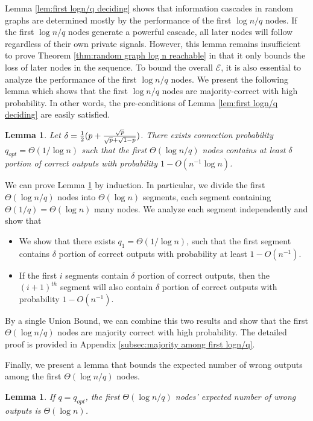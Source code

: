 \documentclass[a4paper,UKenglish]{lipics}
\newtheorem{lem}[thm]{Lemma}
\theoremstyle{definition}
\begin{document}
Lemma \ref{lem:first logn/q deciding} shows that information cascades 
	in random graphs are determined mostly by the performance of the first $\log n/q$ nodes.
If the first $\log n/q$ nodes generate a powerful cascade, all later nodes will follow regardless of their own private signals.
However, this lemma remains insufficient to prove Theorem \ref{thm:random graph log n reachable}
	in that it only bounds the loss of later nodes in the sequence.
To bound the overall $\mathcal{E}$, it is also essential to analyze the performance of the first $\log n/q$ nodes.
We present the following lemma which shows that the first $\log n/q$ nodes are majority-correct with high probability.
In other words, the pre-conditions of Lemma \ref{lem:first logn/q deciding} are easily satisfied.

\begin{lem}
\label{lem:majority among first logn/q}
Let $\delta = {1\over 2}(p + {\sqrt{p}\over \sqrt{p} + \sqrt{1-p}})$.
There exists connection probability $q_{opt} = \Theta(1/\log n)$ such that the first $\Theta(\log n/q)$ nodes 
	contains at least $\delta$ portion of correct outputs with probability $1 - O(n^{-1}\log n)$.
\end{lem}


We can prove Lemma \ref{lem:majority among first logn/q} by induction.
In particular, we divide the first $\Theta(\log n/q)$ nodes into $\Theta(\log n)$ segments, 
	each segment containing $\Theta(1/q) = \Theta(\log n)$ many nodes.
We analyze each segment independently and show that 
\begin{itemize}
\item We show that there exists $q_1 = \Theta(1/\log n)$, 
		such that the first segment contains $\delta$ portion of correct outputs with probability at least $1 - O(n^{-1})$.
\item If the first $i$ segments contain $\delta$ portion of correct outputs,
		then the $(i+1)^{th}$ segment will also contain $\delta$ portion of correct outputs with probability $1 - O(n^{-1})$.
\end{itemize}
By a single Union Bound, we can combine this two results and show that
	the first $\Theta(\log n/q)$ nodes are majority correct with high probability.
The detailed proof is provided in Appendix \ref{subsec:majority among first logn/q}.

Finally, we present a lemma that bounds the expected number of wrong outputs among the first $\Theta(\log n / q)$ nodes.

\begin{lem}
\label{lem:loss of former nodes}
If $q = q_{opt}$, the first $\Theta(\log n/q)$ nodes' expected number of wrong outputs is $\Theta(\log n)$.
\end{lem}
\end{document}
